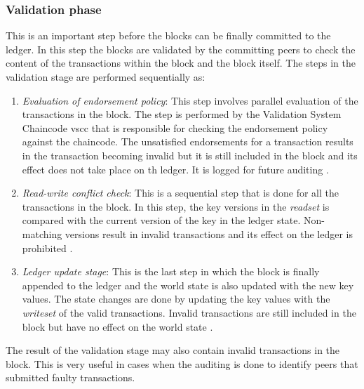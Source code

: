 \documentclass[
  a4paper,  %
  twoside,  %
  bibliography=totoc,
  headsepline,
  cleardoublepage=empty,
  parskip=half,
  draft=false
]{scrbook}
\begin{document}
\subsubsection{Validation phase}
This is an important step before the blocks can be finally committed to the ledger. In this step the blocks are validated by the committing peers to check the content of the transactions within the block and the block itself. The steps in the validation stage are performed sequentially as: 
\begin{enumerate}
    \item \textit{Evaluation of endorsement policy}: This step involves parallel evaluation of the transactions in the block. The step is performed by the Validation System Chaincode \gls{vscc} that is responsible for checking the endorsement policy against the chaincode. The unsatisfied endorsements for a transaction results in the transaction becoming invalid but it is still included in the block and its effect does not take place on th ledger. It is logged for future auditing \cite{HF}.
    \item \textit{Read-write conflict check}: This is a sequential step that is done for all the transactions in the block. In this step, the key versions in the \textit{readset} is compared with the current version of the key in the ledger state. Non-matching versions result in invalid transactions and its effect on the ledger is prohibited \cite{HF}.
    \item \textit{Ledger update stage}: This is the last step in which the block is finally appended to the ledger and the world state is also updated with the new key values. The state changes are done by updating the key values with the \textit{writeset} of the valid transactions. Invalid transactions are still included in the block but have no effect on the world state \cite{HF}.
\end{enumerate}
The result of the validation stage may also contain invalid transactions in the block. This is very useful in cases when the auditing is done to identify peers that submitted faulty transactions.  
\end{document}
